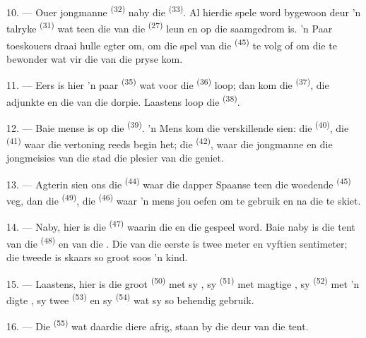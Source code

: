10. --- Ouer jongmanne  \textsuperscript{(32)} naby die
 \textsuperscript{(33)}. Al hierdie spele word bygewoon deur 'n talryke
 \textsuperscript{(31)} wat teen die  van die
 \textsuperscript{(27)} leun en op die  saamgedrom is. 'n Paar
toeskouers draai hulle egter om, om die spel van die 
\textsuperscript{(45)} te volg of om die  te bewonder wat vir
die  van die pryse kom.

11. --- Eers is hier 'n paar  \textsuperscript{(35)} wat voor die
 \textsuperscript{(36)} loop; dan kom die 
\textsuperscript{(37)}, die adjunkte en die  van die dorpie.
Laastens loop die  \textsuperscript{(38)}.

\VUsaut{5.0mm}
\VUsaut{3.6mm}

12. --- Baie mense is op die  \textsuperscript{(39)}. 'n Mens kom
die verskillende  sien: die  \textsuperscript{(40)}, die
 \textsuperscript{(41)} waar die vertoning reeds begin het; die
 \textsuperscript{(42)}, waar die jongmanne en die jongmeisies van
die stad die plesier van die  geniet.

13. --- Agterin sien ons die  \textsuperscript{(44)} waar die dapper
Spaanse  teen die woedende  \textsuperscript{(45)} veg,
dan die  \textsuperscript{(49)}, die 
\textsuperscript{(46)} waar 'n mens jou oefen om  te gebruik en na die
 te skiet.

14. --- Naby, hier is die  \textsuperscript{(47)} waarin die
 en die  gespeel word. Baie naby is die tent van die
 \textsuperscript{(48)} en van die . Die  van
die eerste is twee meter en vyftien sentimeter; die tweede is skaars so groot soos 'n
kind.

15. --- Laastens, hier is die groot  \textsuperscript{(50)} met sy
, sy  \textsuperscript{(51)} met magtige
, sy  \textsuperscript{(52)} met 'n digte ,
sy twee  \textsuperscript{(53)} en sy 
\textsuperscript{(54)} wat sy  so behendig gebruik.

16. --- Die  \textsuperscript{(55)} wat daardie diere afrig, staan by die
deur van die tent.
\VUsaut{6.0mm}
\VUfilet{22mm}
